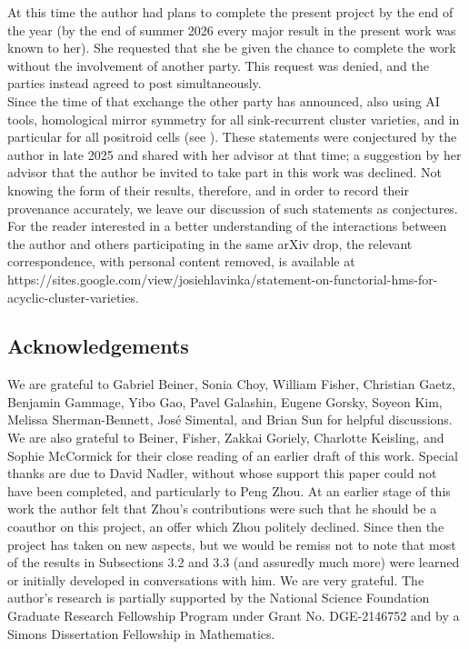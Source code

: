 \documentclass[11pt]{amsart}
\theoremstyle{definition}
\theoremstyle{remark}
\numberwithin{equation}{section}
\begin{document}
At this time the author had plans to complete the present project by the end of the year (by the end of summer 2026 every major result in the present work was known to her). She requested that she be given the chance to complete the work without the involvement of another party. This request was denied, and the parties instead agreed to post simultaneously.\\

Since the time of that exchange the other party has announced, also using AI tools, homological mirror symmetry for all sink-recurrent cluster varieties, and in particular for all positroid cells (see \cite{HS}). These statements were conjectured by the author in late 2025 and shared with her advisor at that time; a suggestion by her advisor that the author be invited to take part in this work was declined. Not knowing the form of their results, therefore, and in order to record their provenance accurately, we leave our discussion of such statements as conjectures.\\

For the reader interested in a better understanding of the interactions between the author and others participating in the same arXiv drop, the relevant correspondence, with personal content removed, is available at https://sites.google.com/view/josiehlavinka/statement-on-functorial-hms-for-acyclic-cluster-varieties.

\subsection{Acknowledgements} We are grateful to Gabriel Beiner, Sonia Choy, William Fisher, Christian Gaetz, Benjamin Gammage, Yibo Gao, Pavel Galashin, Eugene Gorsky, Soyeon Kim, Melissa Sherman-Bennett, Jos\'{e} Simental, and Brian Sun for helpful discussions. We are also grateful to Beiner, Fisher, Zakkai Goriely, Charlotte Keisling, and Sophie McCormick for their close reading of an earlier draft of this work. Special thanks are due to David Nadler, without whose support this paper could not have been completed, and particularly to Peng Zhou. At an earlier stage of this work the author felt that Zhou's contributions were such that he should be a coauthor on this project, an offer which Zhou politely declined. Since then the project has taken on new aspects, but we would be remiss not to note that most of the results in Subsections 3.2 and 3.3 (and assuredly much more) were learned or initially developed in conversations with him. We are very grateful. The author's research is partially supported by the National Science Foundation Graduate Research Fellowship Program under Grant No. DGE-2146752 and by a Simons Dissertation Fellowship in Mathematics.
\end{document}
